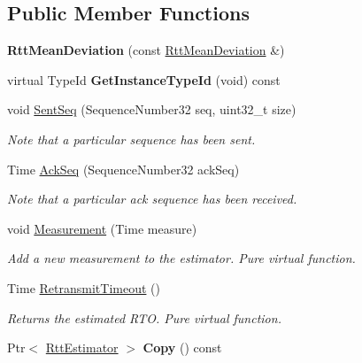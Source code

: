 \subsection*{Public Member Functions}
\begin{DoxyCompactItemize}
\item 
{\bfseries Rtt\+Mean\+Deviation} (const \hyperlink{classns3_1_1ndn_1_1RttMeanDeviation}{Rtt\+Mean\+Deviation} \&)\hypertarget{classns3_1_1ndn_1_1RttMeanDeviation_ae8aa34671660414ccb2abe299bf53e22}{}\label{classns3_1_1ndn_1_1RttMeanDeviation_ae8aa34671660414ccb2abe299bf53e22}

\item 
virtual Type\+Id {\bfseries Get\+Instance\+Type\+Id} (void) const\hypertarget{classns3_1_1ndn_1_1RttMeanDeviation_a9916ec7ac4b9852977fa8b347cd437e9}{}\label{classns3_1_1ndn_1_1RttMeanDeviation_a9916ec7ac4b9852977fa8b347cd437e9}

\item 
void \hyperlink{classns3_1_1ndn_1_1RttMeanDeviation_accd6536614537e19c1cef85e4ecf8368}{Sent\+Seq} (Sequence\+Number32 seq, uint32\+\_\+t size)
\begin{DoxyCompactList}\small\item\em Note that a particular sequence has been sent. \end{DoxyCompactList}\item 
Time \hyperlink{classns3_1_1ndn_1_1RttMeanDeviation_a291b9b4a6847dbc64898aea22c49e206}{Ack\+Seq} (Sequence\+Number32 ack\+Seq)
\begin{DoxyCompactList}\small\item\em Note that a particular ack sequence has been received. \end{DoxyCompactList}\item 
void \hyperlink{classns3_1_1ndn_1_1RttMeanDeviation_ab175e70e52d5e239fc4c21ee5d2aa557}{Measurement} (Time measure)
\begin{DoxyCompactList}\small\item\em Add a new measurement to the estimator. Pure virtual function. \end{DoxyCompactList}\item 
Time \hyperlink{classns3_1_1ndn_1_1RttMeanDeviation_ab7df92b998bac93fcfc533e0d422f061}{Retransmit\+Timeout} ()
\begin{DoxyCompactList}\small\item\em Returns the estimated R\+TO. Pure virtual function. \end{DoxyCompactList}\item 
Ptr$<$ \hyperlink{classns3_1_1ndn_1_1RttEstimator}{Rtt\+Estimator} $>$ {\bfseries Copy} () const\hypertarget{classns3_1_1ndn_1_1RttMeanDeviation_a0152da8ee79006c0a3565db565e67a5a}{}\label{classns3_1_1ndn_1_1RttMeanDeviation_a0152da8ee79006c0a3565db565e67a5a}


\end{DoxyCompactItemize}
